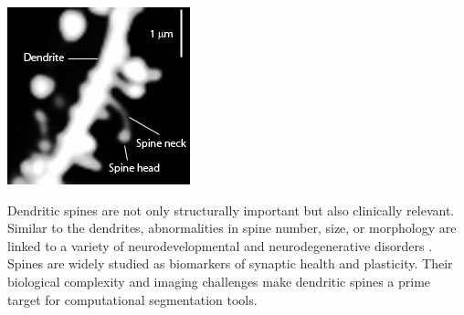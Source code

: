 \begin{center}
    \includegraphics[width=.6\textwidth]{figures/05_spine_closeup.jpg} 
    \label{fig:spine_closeup}
\end{center}

Dendritic spines are not only structurally important but also clinically relevant. Similar to the dendrites, abnormalities in spine number, size, or morphology are linked to a variety of neurodevelopmental and neurodegenerative disorders \cite{Rodriguez_2008, Dickstein_2016}. Spines are widely studied as biomarkers of synaptic health and plasticity. Their biological complexity and imaging challenges make dendritic spines a prime target for computational segmentation tools. 

